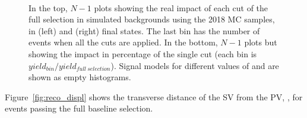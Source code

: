 \begin{figure}[t]
  \noindent
  \\
  \caption{In the top, $N-1$ plots showing the real impact of each cut of the full selection in simulated backgrounds using the 2018 MC samples,
    in \eex (left) and \mmx (right) final states. The last bin has the number of events when all the cuts are applied.
    In the bottom, $N-1$ plots but showing the impact in percentage of the single cut (each bin is $yield_{bin}/yield_{full\:selection}$).
    Signal models for different values of \mhnl and \mixpar
    are shown as empty histograms.}
  \label{fig:cutflow2}
\end{figure}
\vspace{2mm}

Figure~\ref{fig:reco_displ} shows the transverse
distance of the SV from the PV, \Deltwod, for events
passing the full baseline selection.

